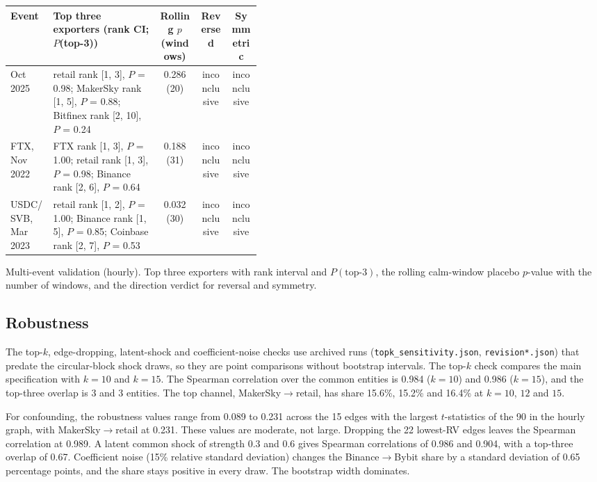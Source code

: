 \documentclass[referee,pdflatex,sn-mathphys-ay]{sn-jnl}
\newcommand{\fitbox}{\ifdim\wd\tabbox>\linewidth\resizebox{\linewidth}{!}{\usebox{\tabbox}}\else\usebox{\tabbox}\fi}%
\theoremstyle{thmstyleone}%
\theoremstyle{thmstyletwo}%
\theoremstyle{thmstylethree}%
\begin{document}
\begin{lrbox}{\tabbox}\footnotesize\setlength{\tabcolsep}{3pt}%
\begin{tabular}{@{}lp{0.42\linewidth}ccc@{}}
\toprule
\textbf{Event} & \textbf{Top three exporters (rank CI; $P$(top-3))} & \textbf{Rolling $p$ (windows)} & \textbf{Reversed} & \textbf{Symmetric}\\
\midrule
Oct 2025 & retail rank [1, 3], $P$ = 0.98; MakerSky rank [1, 5], $P$ = 0.88; Bitfinex rank [2, 10], $P$ = 0.24 & 0.286 (20) & inconclusive & inconclusive \\
FTX, Nov 2022 & FTX rank [1, 3], $P$ = 1.00; retail rank [1, 3], $P$ = 0.98; Binance rank [2, 6], $P$ = 0.64 & 0.188 (31) & inconclusive & inconclusive \\
USDC/SVB, Mar 2023 & retail rank [1, 2], $P$ = 1.00; Binance rank [1, 5], $P$ = 0.85; Coinbase rank [2, 7], $P$ = 0.53 & 0.032 (30) & inconclusive & inconclusive \\
\bottomrule
\end{tabular}
\end{lrbox}
\begin{tableorg}[tbp]
\centering
\caption{Multi-event validation (hourly). Top three exporters with rank interval and $P(\text{top-3})$, the rolling
calm-window placebo $p$-value with the number of windows, and the direction verdict for reversal and symmetry.}
\label{tab:events}
\fitbox
\end{tableorg}

\subsection{Robustness}
\label{subsec:robustness}
The top-$k$, edge-dropping, latent-shock and coefficient-noise checks use archived runs (\texttt{topk\_sensitivity.json},
\texttt{revision*.json}) that predate the circular-block shock draws, so they are point comparisons without bootstrap intervals. The top-$k$ check compares the main specification with $k=10$ and $k=15$. The Spearman correlation over the common entities is
0.984 ($k=10$) and 0.986 ($k=15$), and the top-three overlap is 3 and 3 entities. The top channel,
MakerSky$\to$retail, has share 15.6\%, 15.2\% and 16.4\% at $k=10$, $12$ and $15$.

For confounding, the robustness values range from 0.089 to 0.231 across the 15 edges with the largest $t$-statistics of the 90 in the hourly graph, with
MakerSky$\to$retail at 0.231. These values are moderate, not large. Dropping the 22 lowest-RV edges leaves the Spearman
correlation at 0.989. A latent common shock of strength 0.3 and 0.6 gives Spearman correlations of 0.986 and 0.904,
with a top-three overlap of 0.67. Coefficient noise (15\% relative standard deviation) changes the Binance$\to$Bybit share
by a standard deviation of 0.65 percentage points, and the share stays positive in every draw. The bootstrap width dominates.
\end{document}
